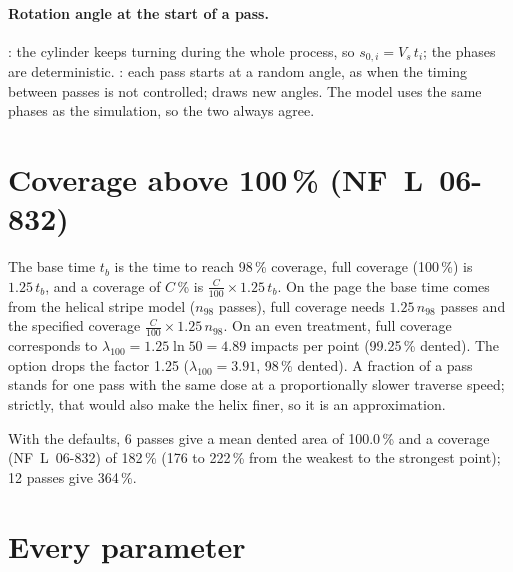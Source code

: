 \documentclass[11pt,a4paper]{article}
\begin{document}
\paragraph{Rotation angle at the start of a pass.} : the cylinder keeps turning during the whole process, so $s_{0,i}=V_s\,t_i$; the phases are deterministic. : each pass starts at a random angle, as when the timing between passes is not controlled;  draws new angles. The model uses the same phases as the simulation, so the two always agree.

\section{Coverage above 100\,\% (NF~L~06-832)}\label{sec:above}

The base time $t_b$ is the time to reach 98\,\% coverage, full coverage (100\,\%) is $1.25\,t_b$, and a coverage of $C$\,\% is $\frac{C}{100}\times1.25\,t_b$. On the page the base time comes from the helical stripe model ($n_{98}$ passes), full coverage needs $1.25\,n_{98}$ passes and the specified coverage $\frac{C}{100}\times1.25\,n_{98}$. On an even treatment, full coverage corresponds to $\lambda_{100}=1.25\ln50=4.89$ impacts per point (99.25\,\% dented). The option  drops the factor 1.25 ($\lambda_{100}=3.91$, 98\,\% dented). A fraction of a pass stands for one pass with the same dose at a proportionally slower traverse speed; strictly, that would also make the helix finer, so it is an approximation.



\noindent With the defaults, 6 passes give a mean dented area of 100.0\,\% and a coverage (NF~L~06-832) of 182\,\% (176 to 222\,\% from the weakest to the strongest point); 12 passes give 364\,\%.

\section{Every parameter}
\end{document}
